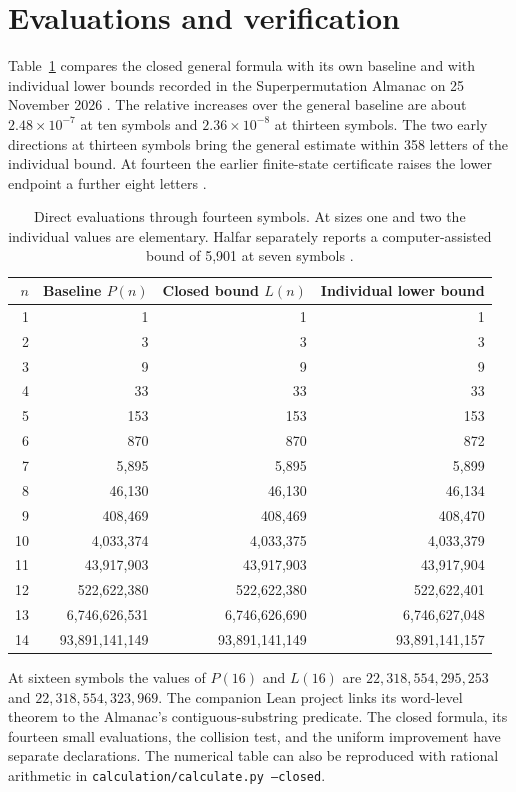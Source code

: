 \documentclass[11pt]{article}
\newcommand{\code}[1]{\texttt{\small #1}}
\begin{document}
\section{Evaluations and verification}
Table~\ref{tab:values} compares the closed general formula with its own
baseline and with individual lower bounds recorded in the Superpermutation
Almanac on 25 November 2026 \cite{records}. The relative increases over the general baseline are about $2.48\times10^{-7}$ at ten symbols and $2.36\times10^{-8}$ at thirteen symbols. The two early directions at
thirteen symbols bring the general estimate within 358 letters of the
individual bound. At fourteen the earlier finite-state certificate raises
the lower endpoint a further eight letters \cite{fourteen}.
\begin{table}[ht]
\centering
\small
\begin{tabular}{@{}rrrr@{}}\toprule
$n$&Baseline $P(n)$&Closed bound $L(n)$&Individual lower bound\\\midrule
1&1&1&1\\2&3&3&3\\3&9&9&9\\4&33&33&33\\5&153&153&153\\
6&870&870&872\\7&5,895&5,895&5,899\\8&46,130&46,130&46,134\\
9&408,469&408,469&408,470\\10&4,033,374&4,033,375&4,033,379\\
11&43,917,903&43,917,903&43,917,904\\
12&522,622,380&522,622,380&522,622,401\\
13&6,746,626,531&6,746,626,690&6,746,627,048\\
14&93,891,141,149&93,891,141,149&93,891,141,157\\\bottomrule
\end{tabular}
\caption{Direct evaluations through fourteen symbols. At sizes one and two
the individual values are elementary. Halfar separately reports a
computer-assisted bound of 5,901 at seven symbols \cite{seven}.}
\label{tab:values}
\end{table}

At sixteen symbols the values of $P(16)$ and $L(16)$ are
$22{,}318{,}554{,}295{,}253$ and $22{,}318{,}554{,}323{,}969$.
The companion Lean project links its word-level theorem to the Almanac's
contiguous-substring predicate. The closed formula, its fourteen small
evaluations, the collision test, and the uniform improvement have separate
declarations. The numerical table can also be reproduced with rational
arithmetic in \code{calculation/calculate.py --closed}.
\end{document}
